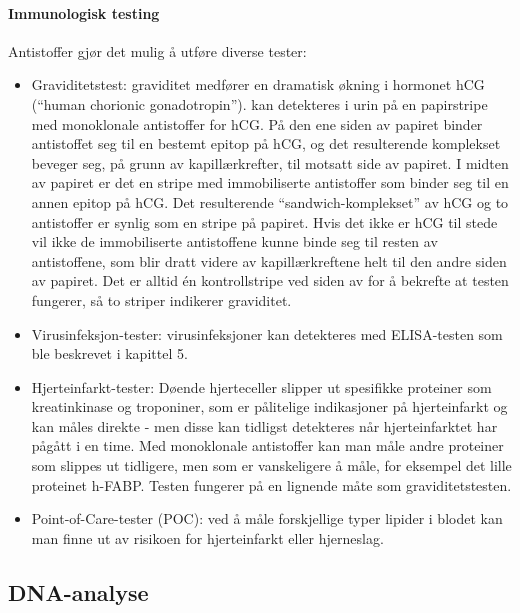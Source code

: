 \paragraph{Immunologisk testing} Antistoffer gjør det mulig å utføre diverse tester:
\begin{itemize}[nolistsep,noitemsep]
	\item Graviditetstest: graviditet medfører en dramatisk økning i hormonet hCG (``human chorionic gonadotropin'').  kan detekteres i urin på en papirstripe med monoklonale antistoffer for hCG. På den ene siden av papiret binder antistoffet seg til en bestemt epitop på hCG, og det resulterende komplekset beveger seg, på grunn av kapillærkrefter, til motsatt side av papiret. I midten av papiret er det en stripe med immobiliserte antistoffer som binder seg til en annen epitop på hCG. Det resulterende ``sandwich-komplekset'' av hCG og to antistoffer er synlig som en stripe på papiret. Hvis det ikke er hCG til stede vil ikke de immobiliserte antistoffene kunne binde seg til resten av antistoffene, som blir dratt videre av kapillærkreftene helt til den andre siden av papiret. Det er alltid én kontrollstripe ved siden av for å bekrefte at testen fungerer, så to striper indikerer graviditet.
	\item Virusinfeksjon-tester: virusinfeksjoner kan detekteres med ELISA-testen som ble beskrevet i kapittel 5.
	\item Hjerteinfarkt-tester: Døende hjerteceller slipper ut spesifikke proteiner som kreatinkinase og troponiner, som er pålitelige indikasjoner på hjerteinfarkt og kan måles direkte - men disse kan tidligst detekteres når hjerteinfarktet har pågått i en time. Med monoklonale antistoffer kan man måle andre proteiner som slippes ut tidligere, men som er vanskeligere å måle, for eksempel det lille proteinet h-FABP. Testen fungerer på en lignende måte som graviditetstesten.
	\item Point-of-Care-tester (POC): ved å måle forskjellige typer lipider i blodet kan man finne ut av risikoen for hjerteinfarkt eller hjerneslag.
\end{itemize}

\begin{centering}\subsection{DNA-analyse}\end{centering}

